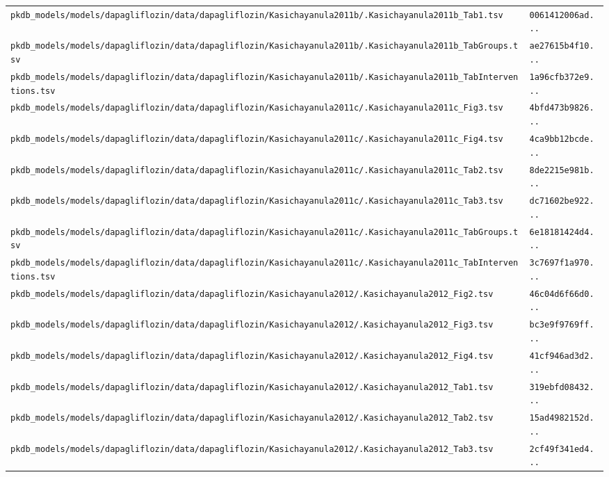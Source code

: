 \begin{longtable}{ll}
\texttt{pkdb\_models/models/dapagliflozin/data/dapagliflozin/Kasichayanula2011b/.Kasichayanula2011b\_Tab1.tsv} & \texttt{0061412006ad...} \\
\texttt{pkdb\_models/models/dapagliflozin/data/dapagliflozin/Kasichayanula2011b/.Kasichayanula2011b\_TabGroups.tsv} & \texttt{ae27615b4f10...} \\
\texttt{pkdb\_models/models/dapagliflozin/data/dapagliflozin/Kasichayanula2011b/.Kasichayanula2011b\_TabInterventions.tsv} & \texttt{1a96cfb372e9...} \\
\texttt{pkdb\_models/models/dapagliflozin/data/dapagliflozin/Kasichayanula2011c/.Kasichayanula2011c\_Fig3.tsv} & \texttt{4bfd473b9826...} \\
\texttt{pkdb\_models/models/dapagliflozin/data/dapagliflozin/Kasichayanula2011c/.Kasichayanula2011c\_Fig4.tsv} & \texttt{4ca9bb12bcde...} \\
\texttt{pkdb\_models/models/dapagliflozin/data/dapagliflozin/Kasichayanula2011c/.Kasichayanula2011c\_Tab2.tsv} & \texttt{8de2215e981b...} \\
\texttt{pkdb\_models/models/dapagliflozin/data/dapagliflozin/Kasichayanula2011c/.Kasichayanula2011c\_Tab3.tsv} & \texttt{dc71602be922...} \\
\texttt{pkdb\_models/models/dapagliflozin/data/dapagliflozin/Kasichayanula2011c/.Kasichayanula2011c\_TabGroups.tsv} & \texttt{6e18181424d4...} \\
\texttt{pkdb\_models/models/dapagliflozin/data/dapagliflozin/Kasichayanula2011c/.Kasichayanula2011c\_TabInterventions.tsv} & \texttt{3c7697f1a970...} \\
\texttt{pkdb\_models/models/dapagliflozin/data/dapagliflozin/Kasichayanula2012/.Kasichayanula2012\_Fig2.tsv} & \texttt{46c04d6f66d0...} \\
\texttt{pkdb\_models/models/dapagliflozin/data/dapagliflozin/Kasichayanula2012/.Kasichayanula2012\_Fig3.tsv} & \texttt{bc3e9f9769ff...} \\
\texttt{pkdb\_models/models/dapagliflozin/data/dapagliflozin/Kasichayanula2012/.Kasichayanula2012\_Fig4.tsv} & \texttt{41cf946ad3d2...} \\
\texttt{pkdb\_models/models/dapagliflozin/data/dapagliflozin/Kasichayanula2012/.Kasichayanula2012\_Tab1.tsv} & \texttt{319ebfd08432...} \\
\texttt{pkdb\_models/models/dapagliflozin/data/dapagliflozin/Kasichayanula2012/.Kasichayanula2012\_Tab2.tsv} & \texttt{15ad4982152d...} \\
\texttt{pkdb\_models/models/dapagliflozin/data/dapagliflozin/Kasichayanula2012/.Kasichayanula2012\_Tab3.tsv} & \texttt{2cf49f341ed4...} \\

\end{longtable}

